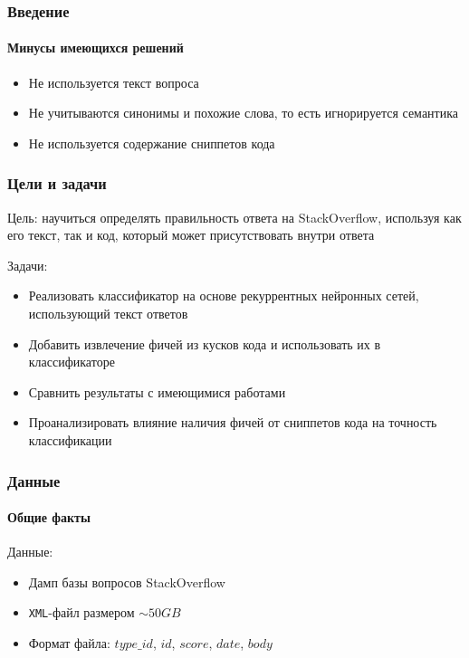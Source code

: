 \documentclass[10pt]{beamer}
\begin{document}
\begin{frame}
\frametitle{Введение}
\framesubtitle{Минусы имеющихся решений}

\begin{itemize}
	\item Не используется текст вопроса
	\item Не учитываются синонимы и похожие слова, то есть игнорируется семантика
	\item Не используется содержание сниппетов кода
\end{itemize}

\end{frame}



\begin{frame}
\frametitle{Цели и задачи}

Цель: научиться определять правильность ответа на StackOverflow, используя как его текст, так и код, который может присутствовать внутри ответа

\medskip

Задачи:
\begin{itemize}
	\item Реализовать классификатор на основе рекуррентных нейронных сетей, использующий текст ответов
	\item Добавить извлечение фичей из кусков кода и использовать их в классификаторе 
	\item Сравнить результаты с имеющимися работами
	\item Проанализировать влияние наличия фичей от сниппетов кода на точность классификации
\end{itemize}


\end{frame}


\begin{frame}
\frametitle{Данные}
\framesubtitle{Общие факты}

Данные:

\begin{itemize}
	\item Дамп базы вопросов StackOverflow
	\item \texttt{XML}-файл размером $\sim50GB$
	\item Формат файла: $type\_id$, $id$, $score$, $date$, $body$
\end{itemize}

\end{frame}
\end{document}
